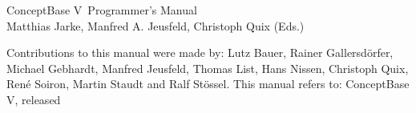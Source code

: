 
\begin{titlepage}

\vspace*{5cm}

\begin{center}
{\LARGE ConceptBase V\relnr\ Programmer's Manual}\\[2cm]

{\large Matthias Jarke, Manfred A. Jeusfeld, Christoph Quix (Eds.)}\\[4cm]
\end{center}

\noindent Contributions to this manual were made by: Lutz Bauer, Rainer
Gallersd\"orfer, Michael Gebhardt, Manfred Jeusfeld, Thomas List,
Hans Nissen, Christoph Quix, Ren\'e Soiron, Martin Staudt and
Ralf St\"ossel. \newline\newline
%
This manual refers to: ConceptBase V\relnr, released \reldate\newline


\vspace{2.5cm}

\end{titlepage}


